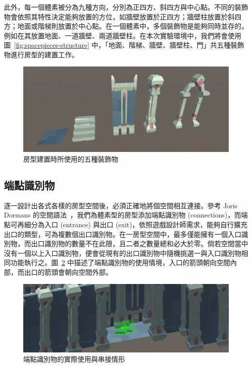 此外，每一個體素被分為九種方向，分別為正四方、斜四方與中心點。不同的裝飾物會依照其特性決定能夠放置的方位，如牆壁放置於正四方；牆壁柱放置於斜四方；地面或階梯則放置於中心點。在一個體素中，多個裝飾物是能夠同時並存的，例如在其放置地面、一道牆壁、兩道牆壁柱。在本次實驗環境中，我們將會使用圖~\ref{fig:spacepieces-structure} 中，「地面、階梯、牆壁、牆壁柱、門」共五種裝飾物進行房型的建置工作。

\begin{figure}[ht]
  \begin{center}
    \includegraphics[width=1.0\textwidth]{figures/decorations-with-directions.png}
    \caption{房型建置時所使用的五種裝飾物}
    \label{fig:decorations-with-directions}
  \end{center}
\end{figure}

\subsection{端點識別物}
\label{ssec:method-spacepieces-connections}

逐一設計出各式各樣的房型空間後，必須正確地將個空間相互連接。參考 Joris Dormans 的空間語法~\cite{dormans2012engineering}，我們為體素型的房型添加端點識別物 (connections)，而端點可再細分為入口 (entrance) 與出口 (exit)，依照遊戲設計師需求，能夠自行擴充出口的類型，可為複數個出口識別物。在一房型空間中，最多僅能擁有一個入口識別物，而出口識別物的數量不在此限，且二者之數量總和必大於零。倘若空間當中沒有一個以上入口識別物，便會從現有的出口識別物中隨機挑選一與入口識別物相同功能執行之。圖~\ref{fig:connections-in-volume} 中描述了端點識別物的使用情境，入口的箭頭朝向空間內部，而出口的箭頭會朝向空間外部。

\begin{figure}[ht]
  \begin{center}
    \includegraphics[width=1.0\textwidth]{figures/connections-in-volume.png}
    \caption{端點識別物的實際使用與串接情形} 
    \label{fig:connections-in-volume}
  \end{center}
\end{figure}

